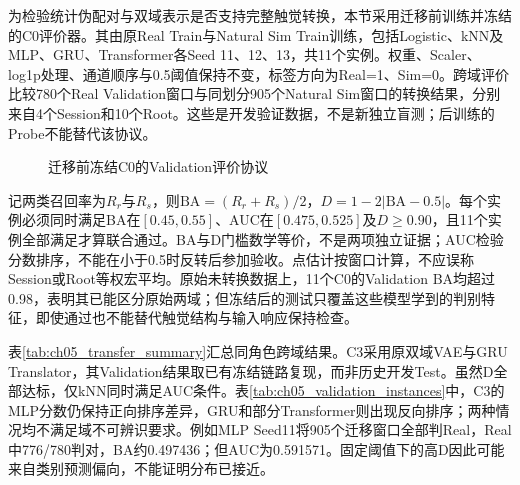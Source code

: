 为检验统计伪配对与双域表示是否支持完整触觉转换，本节采用迁移前训练并冻结的C0评价器。其由原Real Train与Natural Sim Train训练，包括Logistic、kNN及MLP、GRU、Transformer各Seed 11、12、13，共11个实例。权重、Scaler、log1p处理、通道顺序与0.5阈值保持不变，标签方向为Real=1、Sim=0。跨域评价比较780个Real Validation窗口与同划分905个Natural Sim窗口的转换结果，分别来自4个Session和10个Root。这些是开发验证数据，不是新独立盲测；后训练的Probe不能替代该协议。

\begin{figure}[htbp]
 \centering
 \caption{迁移前冻结C0的Validation评价协议}
 \label{fig:ch05_c0_validation_protocol}
\end{figure}

记两类召回率为$R_r$与$R_s$，则$\mathrm{BA}=(R_r+R_s)/2$，$D=1-2|\mathrm{BA}-0.5|$。每个实例必须同时满足BA在$[0.45,0.55]$、AUC在$[0.475,0.525]$及$D\ge0.90$，且11个实例全部满足才算联合通过。BA与D门槛数学等价，不是两项独立证据；AUC检验分数排序，不能在小于0.5时反转后参加验收。点估计按窗口计算，不应误称Session或Root等权宏平均。原始未转换数据上，11个C0的Validation BA均超过0.98，表明其已能区分原始两域；但冻结后的测试只覆盖这些模型学到的判别特征，即使通过也不能替代触觉结构与输入响应保持检查。

表\ref{tab:ch05_transfer_summary}汇总同角色跨域结果。C3采用原双域VAE与GRU Translator，其Validation结果取已有冻结链路复现，而非历史开发Test。虽然D全部达标，仅kNN同时满足AUC条件。表\ref{tab:ch05_validation_instances}中，C3的MLP分数仍保持正向排序差异，GRU和部分Transformer则出现反向排序；两种情况均不满足域不可辨识要求。例如MLP Seed11将905个迁移窗口全部判Real，Real中776/780判对，BA约0.497436；但AUC为0.591571。固定阈值下的高D因此可能来自类别预测偏向，不能证明分布已接近。

